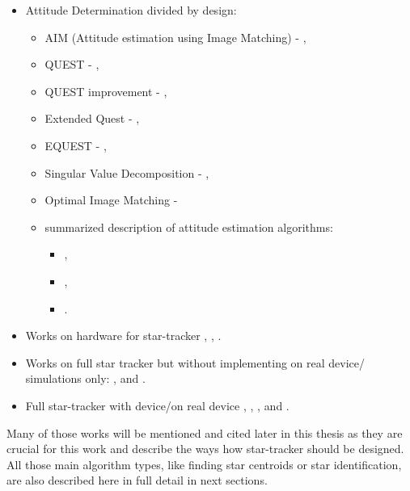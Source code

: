 \documentclass[12pt,a4paper,oneside]{article}
\begin{document}
\begin{itemize}[noitemsep]
\item Attitude Determination divided by design: 
\begin{itemize}[noitemsep]
\item AIM (Attitude estimation using Image Matching) - \citet{delabie2012highly}, 
\item QUEST - \citet{shuster1990kalman}, 
\item QUEST improvement - \citet{cheng2014improvement}, 
\item Extended Quest - \citet{psiaki1999extended}, 
\item EQUEST - \citet{rinnan2012development}, 
\item Singular Value Decomposition - \citet{juang2003efficient}, 
\item Optimal Image Matching - \citet{delabie2012highly}
\item summarized description of attitude estimation algorithms: 
\begin{itemize}[noitemsep]
\item \citet{markley1999estimate},
\item \citet{hall2003spacecraft},
\item \citet{tappe2009development}.
\end{itemize}
\end{itemize}

\item Works on hardware for star-tracker \citet{azizabadi2014vlsi}, \citet{gaska2016obc}, \citet{felikson2011orbit}.

\item Works on full star tracker but without implementing on real device/ simulations only: \citet{kandiyil2010attitude}, \citet{huffman2006designing} and \citet{diaz2006performance}.

\item Full star-tracker with device/on real device \citet{jalabert2011optimization}, \citet{lizy2010str}, \citet{rose2003star}, \citet{mortari2002starnav} and
\citet{cannata2007autonomous}.

\end{itemize}

Many of those works will be mentioned and cited later in this thesis as they are crucial for this work and describe the ways how star-tracker should be designed. All those main algorithm types, like finding star centroids or star identification, are also described here in full detail in next sections.
\end{document}
